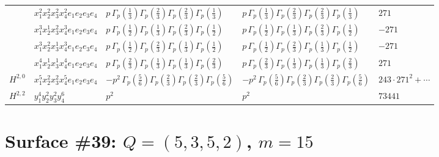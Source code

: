 \documentclass[11pt]{article}
\begin{document}
\begin{table}[ht]
{\begin{tabular}{@{}lllll@{}}
 & $x_{1}^{2} x_{2}^{2} x_{3}^{2} x_{4}^{2}  e_{1} e_{2} e_{3} e_{4}$ & $p \, \Gamma_p \left( \frac{1}{3} \right) \Gamma_p \left( \frac{2}{3} \right) \Gamma_p \left( \frac{2}{3} \right) \Gamma_p \left( \frac{1}{3} \right)$ & $p \, \Gamma_p \left( \frac{1}{3} \right) \Gamma_p \left( \frac{2}{3} \right) \Gamma_p \left( \frac{2}{3} \right) \Gamma_p \left( \frac{1}{3} \right)$ & $271$ \\
 & $x_{1}^{3} x_{2}^{1} x_{3}^{2} x_{4}^{3}  e_{1} e_{2} e_{3} e_{4}$ & $p \, \Gamma_p \left( \frac{1}{2} \right) \Gamma_p \left( \frac{1}{3} \right) \Gamma_p \left( \frac{2}{3} \right) \Gamma_p \left( \frac{1}{2} \right)$ & $p \, \Gamma_p \left( \frac{1}{2} \right) \Gamma_p \left( \frac{1}{3} \right) \Gamma_p \left( \frac{2}{3} \right) \Gamma_p \left( \frac{1}{2} \right)$ & $-271$ \\
 & $x_{1}^{3} x_{2}^{2} x_{3}^{1} x_{4}^{3}  e_{1} e_{2} e_{3} e_{4}$ & $p \, \Gamma_p \left( \frac{1}{2} \right) \Gamma_p \left( \frac{2}{3} \right) \Gamma_p \left( \frac{1}{3} \right) \Gamma_p \left( \frac{1}{2} \right)$ & $p \, \Gamma_p \left( \frac{1}{2} \right) \Gamma_p \left( \frac{2}{3} \right) \Gamma_p \left( \frac{1}{3} \right) \Gamma_p \left( \frac{1}{2} \right)$ & $-271$ \\
 & $x_{1}^{4} x_{2}^{1} x_{3}^{1} x_{4}^{4}  e_{1} e_{2} e_{3} e_{4}$ & $p \, \Gamma_p \left( \frac{2}{3} \right) \Gamma_p \left( \frac{1}{3} \right) \Gamma_p \left( \frac{1}{3} \right) \Gamma_p \left( \frac{2}{3} \right)$ & $p \, \Gamma_p \left( \frac{2}{3} \right) \Gamma_p \left( \frac{1}{3} \right) \Gamma_p \left( \frac{1}{3} \right) \Gamma_p \left( \frac{2}{3} \right)$ & $271$ \\
\midrule
$H^{2,0}$ & $x_{1}^{5} x_{2}^{2} x_{3}^{2} x_{4}^{5}  e_{1} e_{2} e_{3} e_{4}$ & $- p^{2} \, \Gamma_p \left( \frac{5}{6} \right) \Gamma_p \left( \frac{2}{3} \right) \Gamma_p \left( \frac{2}{3} \right) \Gamma_p \left( \frac{5}{6} \right)$ & $- p^{2} \, \Gamma_p \left( \frac{5}{6} \right) \Gamma_p \left( \frac{2}{3} \right) \Gamma_p \left( \frac{2}{3} \right) \Gamma_p \left( \frac{5}{6} \right)$ & $243{\cdot}271^{2}{+}\cdots$ \\
\midrule
$H^{2,2}$ & $y_{1}^{4} y_{2}^{2} y_{3}^{2} y_{4}^{6}$ & $p^{2} \,$ & $p^{2} \,$ & $73441$ \\
\bottomrule
\end{tabular}
}
\renewcommand{\arraystretch}{1.0}
\end{table}

\newpage

\section*{Surface \#39: $Q=(5, 3, 5, 2)$, $m=15$}
\end{document}
